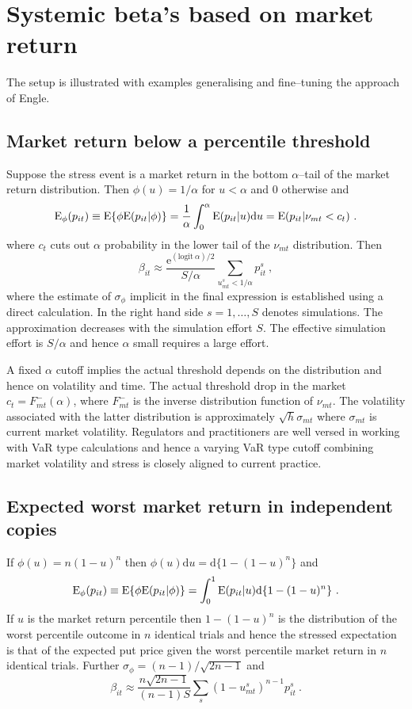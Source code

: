 \documentclass[authoryear]{elsarticle}
\newcommand{\logit}{\mathrm{logit}}
\newcommand{\E}{\mathrm{E}}
\newcommand{\e}{\mathrm{e}}
\newcommand{\de}{\mathrm{d}}
\begin{document}
\section{Systemic beta's based on  market return}
The setup is illustrated with  examples generalising and fine--tuning the approach of Engle.
\subsection{Market return below a percentile threshold} 

Suppose the stress event is a market return in the bottom $\alpha$--tail of the  market return distribution.   Then  $\phi(u)=1/\alpha$ for $u< \alpha$ and 0  otherwise and
$$
\Es(p_{it}) \equiv \E\{\phi\E(p_{it}|\phi)\} = \frac{1}{\alpha}\int_0^\alpha\E(p_{it}|u)\de u = \E(p_{it}|\nu_{mt}<c_{t}) \ .
$$
where $c_t$ cuts out $\alpha$ probability in the lower tail of the $\nu_{mt}$ distribution.   Then
$$
\beta_{it} \approx  \frac{\e^{(\logit\ \alpha)/2}}{S/\alpha} \sum_{u^s_{mt}<1/\alpha}  p_{it}^s\ ,
$$
where the estimate of $\sigma_\phi$ implicit in the final expression is established using a direct calculation.  In the right hand side $s=1,\ldots,S$ denotes simulations.  The approximation decreases with the simulation effort $S$.   The effective simulation effort is $S/\alpha$ and hence $\alpha$ small requires a  large effort.

A fixed $\alpha$ cutoff  implies the actual threshold depends on the distribution and hence  on volatility and  time.  The actual threshold drop in the market $c_t=F_{mt}^-(\alpha)$, where $F_{mt}^-$ is the inverse distribution function of $\nu_{mt}$.  The volatility associated with the latter distribution is approximately $\sqrt{h}\sigma_{mt}$ where $\sigma_{mt}$ is current market volatility.   Regulators and practitioners  are well versed in working with VaR type calculations and hence a varying VaR type cutoff combining market volatility and stress is closely aligned to current practice. 


\subsection{Expected worst market return in independent copies} 
If $\phi(u)=n(1-u)^n$ then $\phi(u)\de u = \de\{1-(1-u)^n\}$ and 
$$
\Es(p_{it}) \equiv \E\{\phi\E(p_{it}|\phi)\} = \int_0^1\E(p_{it}|u)\de\{1-(1-u)^n\}\ .
$$
If $u$ is the market return percentile then  $1-(1-u)^n$ is the distribution of the worst percentile outcome in $n$ identical trials and hence the stressed expectation is that of the expected put price given the worst percentile market return in $n$ identical trials.  Further 
 $\sigma_\phi=(n-1)/\sqrt{2n-1}$ and 
$$
\beta_{it}  \approx \frac{n\sqrt{2n-1}}{(n-1)S} \sum_s (1-u^s_{mt})^{n-1}p_{it}^s \ . 
$$
\end{document}
